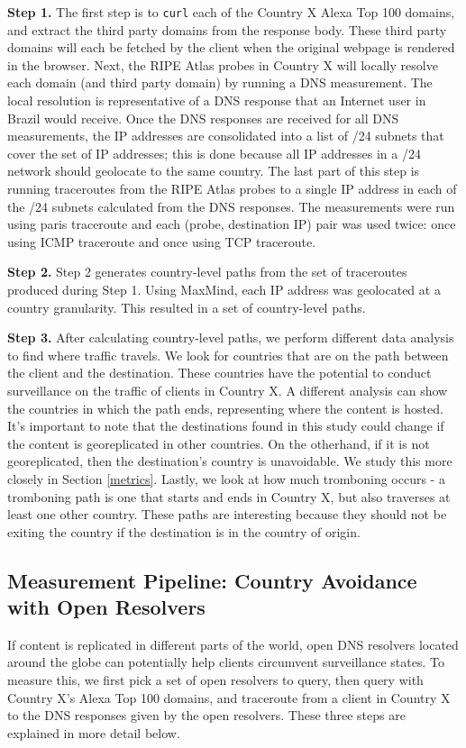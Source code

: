 {\bf Step 1.} The first step is to {\tt curl} each of the Country X Alexa Top 100 domains, and extract the third party domains from the response body.  These third party domains will each be fetched by the client when the original webpage is rendered in the browser.  Next, the RIPE Atlas probes in Country X will locally resolve each domain (and third party domain) by running a DNS measurement.  The local resolution is representative of a DNS response that an Internet user in Brazil would receive.  Once the DNS responses are received for all DNS measurements, the IP addresses are consolidated into a list of /24 subnets that cover the set of IP addresses; this is done because all IP addresses in a /24 network should geolocate to the same country.  The last part of this step is running traceroutes from the RIPE Atlas probes to a single IP address in each of the /24 subnets calculated from the DNS responses.  The measurements were run using paris traceroute and each (probe, destination IP) pair was used twice: once using ICMP traceroute and once using TCP traceroute.  

{\bf Step 2.}  Step 2 generates country-level paths from the set of traceroutes produced during Step 1.  Using MaxMind, each IP address was geolocated at a country granularity.  This resulted in a set of country-level paths.

{\bf Step 3.}  After calculating country-level paths, we perform different data analysis to find where traffic travels.  We look for countries that are on the path between the client and the destination.  These countries have the potential to conduct surveillance on the traffic of clients in Country X.  A different analysis can show the countries in which the path ends, representing where the content is hosted.  It's important to note that the destinations found in this study could change if the content is georeplicated in other countries.  On the otherhand, if it is not georeplicated, then the destination's country is unavoidable.  We study this more closely in Section \ref{metrics}.  Lastly, we look at how much tromboning occurs - a tromboning path is one that starts and ends in Country X, but also traverses at least one other country.  These paths are interesting because they should not be exiting the country if the destination is in the country of origin.  

\subsection{Measurement Pipeline: Country Avoidance with Open Resolvers}
If content is replicated in different parts of the world, open DNS resolvers located around the globe can potentially help clients circumvent surveillance states.  To measure this, we first pick a set of open resolvers to query, then query with Country X's Alexa Top 100 domains, and traceroute from a client in Country X to the DNS responses given by the open resolvers.  These three steps are explained in more detail below.

